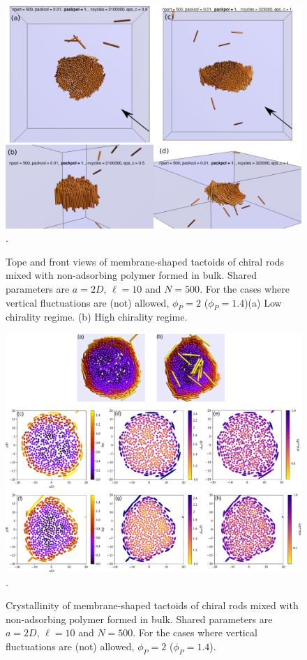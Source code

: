 \begin{figure}
\begin{center}
\includegraphics[width= .8\columnwidth]{figures/chapter-5/samples}.
	\caption{Tope and front views of membrane-shaped tactoids of chiral rods mixed with non-adsorbing polymer formed in bulk. Shared parameters are $a = 2D$, $\ell = 10$ and $N = 500$. For the cases where vertical fluctuations are (not) allowed, $\phi_P=2$ ($\phi_P=1.4$)(a) Low chirality regime. (b) High chirality regime.}
\end{center}
\end{figure}


\begin{figure}
\begin{center}
\includegraphics[width= \columnwidth]{figures/chapter-5/crystallinity}.
	\caption{Crystallinity of membrane-shaped tactoids of chiral rods mixed with non-adsorbing polymer formed in bulk. Shared parameters are $a = 2D$, $\ell = 10$ and $N = 500$. For the cases where vertical fluctuations are (not) allowed, $\phi_P=2$ ($\phi_P=1.4$). } %
\end{center}
\end{figure}


